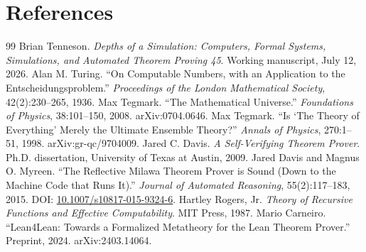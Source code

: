 \documentclass[11pt,letterpaper]{article}
\begin{document}
\section*{References}
\begin{thebibliography}{99}
 Brian Tenneson. \emph{Depths of a Simulation: Computers, Formal Systems, Simulations, and Automated Theorem Proving 45}. Working manuscript, July 12, 2026.
 Alan M. Turing. ``On Computable Numbers, with an Application to the Entscheidungsproblem.'' \emph{Proceedings of the London Mathematical Society}, 42(2):230--265, 1936.
 Max Tegmark. ``The Mathematical Universe.'' \emph{Foundations of Physics}, 38:101--150, 2008. arXiv:0704.0646.
 Max Tegmark. ``Is `The Theory of Everything' Merely the Ultimate Ensemble Theory?'' \emph{Annals of Physics}, 270:1--51, 1998. arXiv:gr-qc/9704009.
 Jared C. Davis. \emph{A Self-Verifying Theorem Prover}. Ph.D. dissertation, University of Texas at Austin, 2009.
 Jared Davis and Magnus O. Myreen. ``The Reflective Milawa Theorem Prover is Sound (Down to the Machine Code that Runs It).'' \emph{Journal of Automated Reasoning}, 55(2):117--183, 2015. DOI: \href{https://doi.org/10.1007/s10817-015-9324-6}{10.1007/s10817-015-9324-6}.
 Hartley Rogers, Jr. \emph{Theory of Recursive Functions and Effective Computability}. MIT Press, 1987.
 Mario Carneiro. ``Lean4Lean: Towards a Formalized Metatheory for the Lean Theorem Prover.'' Preprint, 2024. arXiv:2403.14064.
\end{thebibliography}
\end{document}
